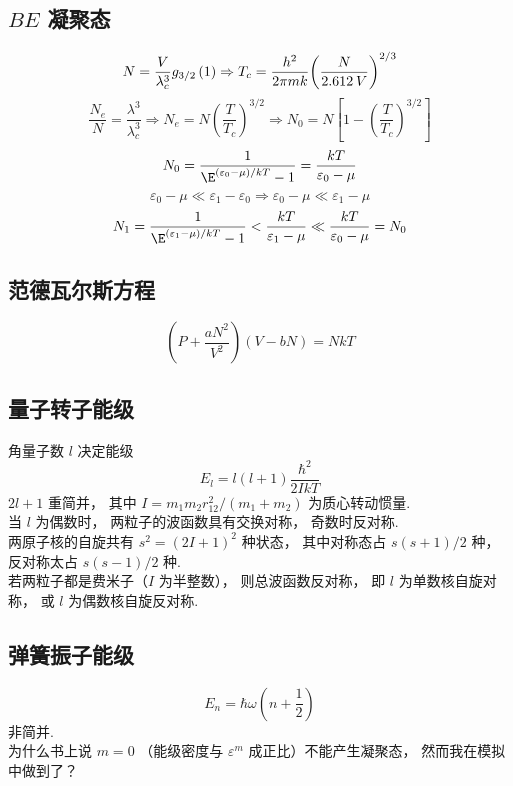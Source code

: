 \subsection{$BE$ 凝聚态}
\begin{equation}
N = \frac{V}{{\lambda _c^3}}{g_{3/2}}\left( 1 \right) \Rightarrow {T_c} = \frac{{{h^2}}}{{2\pi mk}}{\left( {\frac{N}{{2.612{\kern 1pt} {\kern 1pt} V}}} \right)^{2/3}}
\end{equation}
\begin{equation}
\frac{{{N_e}}}{N} = \frac{{{\lambda ^3}}}{{\lambda _c^3}} \Rightarrow {N_e} = N{\left( {\frac{T}{{{T_c}}}} \right)^{3/2}} \Rightarrow {N_0} = N\left[ {1 - {{\left( {\frac{T}{{{T_c}}}} \right)}^{3/2}}} \right]
\end{equation}
\begin{equation}
{N_0} = \frac{1}{{{\E^{({\varepsilon _0} - \mu )/kT}} - 1}} = \frac{{kT}}{{{\varepsilon _0} - \mu }}
\end{equation}
\begin{equation}
{\varepsilon _0} - \mu  \ll {\varepsilon _1} - {\varepsilon _0} \Rightarrow {\varepsilon _0} - \mu  \ll {\varepsilon _1} - \mu 
\end{equation}
\begin{equation}
{N_1} = \frac{1}{{{\E^{({\varepsilon _1} - \mu )/kT}} - 1}} < \frac{{kT}}{{{\varepsilon _1} - \mu }} \ll \frac{{kT}}{{{\varepsilon _0} - \mu }} = {N_0}
\end{equation}
\subsection{范德瓦尔斯方程}
\begin{equation}
\left( {P + \frac{{a{N^2}}}{{{V^2}}}} \right)\left( {V - bN} \right) = NkT
\end{equation}
\subsection{量子转子能级}
角量子数 $l$ 决定能级
\begin{equation}
{E_l} = l\left( {l + 1} \right)\frac{{{\hbar ^2}}}{{2IkT}}
\end{equation}
$2l+1$ 重简并， 其中 $I = {{{m_1}{m_2}r_{12}^2}}/({{{m_1} + {m_2}}})$ 为质心转动惯量.\\
当 $l$ 为偶数时， 两粒子的波函数具有交换对称， 奇数时反对称.\\
两原子核的自旋共有 ${s^2} = {\left( {2I + 1} \right)^2}$ 种状态， 其中对称态占 ${{s\left( {s + 1} \right)}}/{2}$ 种， 反对称太占 ${{s\left( {s - 1} \right)}}/{2}$ 种.\\
若两粒子都是费米子（$I$ 为半整数）， 则总波函数反对称， 即 $l$ 为单数核自旋对称， 或 $l$ 为偶数核自旋反对称.\\
\subsection{弹簧振子能级}
\begin{equation}
{E_n} = \hbar \omega \left( {n + \frac{1}{2}} \right)
\end{equation}
非简并.\\
为什么书上说 $m = 0 $ （能级密度与 ${\varepsilon ^m}$ 成正比）不能产生凝聚态， 然而我在模拟中做到了？\\